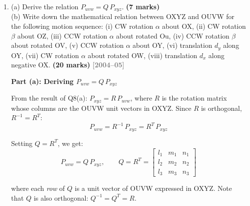 \documentclass[12pt,a3paper]{article}
\newcommand{\yr}[1]{\hfill\textcolor{gray}{\small\textbf{[#1]}}}
\newcommand{\mk}[1]{\textcolor{orange!70!black}{\small\textbf{(#1 marks)}}}
\begin{document}
\begin{enumerate}
\begin{tcolorbox}[enhanced,breakable,ansbox,colback=cB!4,colframe=cB,
  boxrule=0.8pt,arc=5pt,
  title={\textbf{Answer}},fonttitle=\bfseries\color{white},
  colbacktitle=cB]
The combined numerical matrix is:
\[
  T \approx
  \begin{bmatrix}
     0.866 & -0.433 & -0.250 & -5.165\\
     0.500 &  0.750 &  0.433 &  3.750\\
     0     & -0.500 &  0.866 & -2.500\\
     0     &  0     &  0     &  1
  \end{bmatrix}
\]

\end{tcolorbox}

\item \label{qlabel:C2-Q10}
(a) Derive the relation $P_{uvw} = Q\,P_{xyz}$. \mk{7}\\
(b) Write down the mathematical relation between OXYZ and OUVW for the
following motion sequence: (i) CW rotation $\alpha$ about OX, (ii) CW
rotation $\beta$ about OZ, (iii) CCW rotation $\alpha$ about rotated
Ou, (iv) CCW rotation $\beta$ about rotated OV, (v) CCW rotation
$\alpha$ about OY, (vi) translation $d_y$ along OY, (vii) CW rotation
$\alpha$ about rotated OW, (viii) translation $d_x$ along negative
OX. \mk{20}
\yr{2004--05}

\begin{tcolorbox}[enhanced,breakable,ansbox,colback=cB!4,colframe=cB,
  boxrule=0.8pt,arc=5pt,
  title={\textbf{Answer}},fonttitle=\bfseries\color{white},
  colbacktitle=cB]

\textbf{Part (a): Deriving $P_{uvw} = Q\,P_{xyz}$}

\medskip
From the result of Q8(a): $P_{xyz} = R\,P_{uvw}$, where $R$ is the
rotation matrix whose columns are the OUVW unit vectors in OXYZ. Since
$R$ is orthogonal, $R^{-1} = R^T$:
\[
  P_{uvw} = R^{-1}\,P_{xyz} = R^T\,P_{xyz}
\]

Setting $Q = R^T$, we get:
\[
  \boxed{P_{uvw} = Q\,P_{xyz}, \qquad Q = R^T =
  \begin{bmatrix}
    l_1 & m_1 & n_1\\
    l_2 & m_2 & n_2\\
    l_3 & m_3 & n_3
  \end{bmatrix}}
\]

where each \emph{row} of $Q$ is a unit vector of OUVW expressed in
OXYZ. Note that $Q$ is also orthogonal: $Q^{-1} = Q^T = R$.


\end{tcolorbox}
\end{enumerate}
\end{document}
